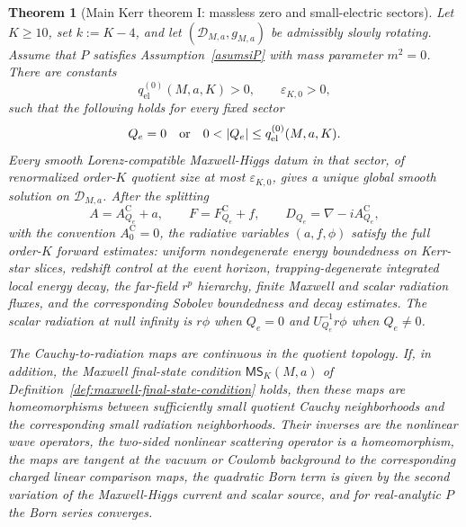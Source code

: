 \documentclass[11pt]{article}
\numberwithin{equation}{section}
\theoremstyle{plain}
\newtheorem{theorem}{Theorem}[section]
\theoremstyle{definition}
\theoremstyle{remark}
\newcommand{\MScat}{\mathsf{MS}}
\begin{document}
\begin{theorem}[Main Kerr theorem I: massless zero and small-electric sectors]\label{thm:main-slow-kerr-intro}
Let \(K\ge10\), set \(k:=K-4\), and let \((\mathcal D_{M,a},g_{M,a})\) be admissibly slowly rotating.  Assume that \(P\) satisfies Assumption~\ref{asumsiP} with mass parameter \(m^2=0\).  There are constants
\begin{equation}\label{eq:intro-small-electric-threshold}
 q_{\mathrm{el}}^{(0)}(M,a,K)>0,
 \qquad
 \varepsilon_{K,0}>0,
\end{equation}
such that the following holds for every fixed sector
\begin{equation}\label{eq:kerr-massless-sector-range}
 Q_e=0
 \quad\hbox{or}\quad
 0<|Q_e|\le q_{\mathrm{el}}^{(0)}(M,a,K).
\end{equation}
Every smooth Lorenz-compatible Maxwell-Higgs datum in that sector, of renormalized order-\(K\) quotient size at most \(\varepsilon_{K,0}\), gives a unique global smooth solution on \(\mathcal D_{M,a}\).  After the splitting
\begin{equation}\label{eq:kerr-main-splitting}
 A=A_{Q_e}^{\mathrm C}+a,
 \qquad
 F=F_{Q_e}^{\mathrm C}+f,
 \qquad
 D_{Q_e}=\nabla-iA_{Q_e}^{\mathrm C},
\end{equation}
with the convention \(A_0^{\mathrm C}=0\), the radiative variables \((a,f,\phi)\) satisfy the full order-\(K\) forward estimates: uniform nondegenerate energy boundedness on Kerr-star slices, redshift control at the event horizon, trapping-degenerate integrated local energy decay, the far-field \(r^p\) hierarchy, finite Maxwell and scalar radiation fluxes, and the corresponding Sobolev boundedness and decay estimates.  The scalar radiation at null infinity is \(r\phi\) when \(Q_e=0\) and \(U_{Q_e}^{-1}r\phi\) when \(Q_e\ne0\).

The Cauchy-to-radiation maps are continuous in the quotient topology.  If, in addition, the Maxwell final-state condition \(\MScat_K(M,a)\) of Definition~\ref{def:maxwell-final-state-condition} holds, then these maps are homeomorphisms between sufficiently small quotient Cauchy neighborhoods and the corresponding small radiation neighborhoods.  Their inverses are the nonlinear wave operators, the two-sided nonlinear scattering operator is a homeomorphism, the maps are tangent at the vacuum or Coulomb background to the corresponding charged linear comparison maps, the quadratic Born term is given by the second variation of the Maxwell-Higgs current and scalar source, and for real-analytic \(P\) the Born series converges.
\end{theorem}
\end{document}
